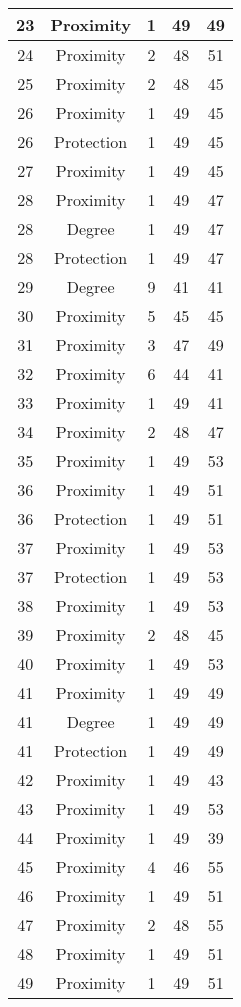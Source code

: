 \documentclass[results.tex]{subfiles}
\begin{document}
\begin{center}
\begin{tabular}{| c || c | c | c | c |}
    \hline
    23 & Proximity & 1 & 49 & 49 \\ 
    \hline
    24 & Proximity & 2 & 48 & 51 \\ 
    \hline
    25 & Proximity & 2 & 48 & 45 \\ 
    \hline
    26 & Proximity & 1 & 49 & 45 \\ 
    \hline
    26 & Protection & 1 & 49 & 45 \\ 
    \hline
    27 & Proximity & 1 & 49 & 45 \\ 
    \hline
    28 & Proximity & 1 & 49 & 47 \\ 
    \hline
    28 & Degree & 1 & 49 & 47 \\ 
    \hline
    28 & Protection & 1 & 49 & 47 \\ 
    \hline
    29 & Degree & 9 & 41 & 41 \\ 
    \hline
    30 & Proximity & 5 & 45 & 45 \\ 
    \hline
    31 & Proximity & 3 & 47 & 49 \\ 
    \hline
    32 & Proximity & 6 & 44 & 41 \\ 
    \hline
    33 & Proximity & 1 & 49 & 41 \\ 
    \hline
    34 & Proximity & 2 & 48 & 47 \\ 
    \hline
    35 & Proximity & 1 & 49 & 53 \\ 
    \hline
    36 & Proximity & 1 & 49 & 51 \\ 
    \hline
    36 & Protection & 1 & 49 & 51 \\ 
    \hline
    37 & Proximity & 1 & 49 & 53 \\ 
    \hline
    37 & Protection & 1 & 49 & 53 \\ 
    \hline
    38 & Proximity & 1 & 49 & 53 \\ 
    \hline
    39 & Proximity & 2 & 48 & 45 \\ 
    \hline
    40 & Proximity & 1 & 49 & 53 \\ 
    \hline
    41 & Proximity & 1 & 49 & 49 \\ 
    \hline
    41 & Degree & 1 & 49 & 49 \\ 
    \hline
    41 & Protection & 1 & 49 & 49 \\ 
    \hline
    42 & Proximity & 1 & 49 & 43 \\ 
    \hline
    43 & Proximity & 1 & 49 & 53 \\ 
    \hline
    44 & Proximity & 1 & 49 & 39 \\ 
    \hline
    45 & Proximity & 4 & 46 & 55 \\ 
    \hline
    46 & Proximity & 1 & 49 & 51 \\ 
    \hline
    47 & Proximity & 2 & 48 & 55 \\ 
    \hline
    48 & Proximity & 1 & 49 & 51 \\ 
    \hline
    49 & Proximity & 1 & 49 & 51 \\ 
    \hline   \end{tabular}
\end{center}
\end{document}
